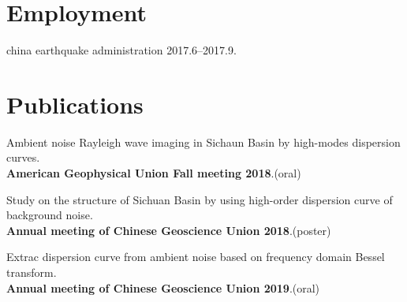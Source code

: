 \documentclass[letterpaper]{article}
\renewenvironment{itemize}{
  \begin{list}{}{
    \setlength{\leftmargin}{1.5em}
  }
}{
  \end{list}
}
\begin{document}
%
%
%


\section*{Employment}

\begin{itemize}
\item  china earthquake administration 2017.6--2017.9.

\end{itemize}


\section*{Publications}


\begin{itemize}
\item Ambient noise Rayleigh wave imaging in Sichaun Basin by high-modes dispersion curves.\\
\textbf{American Geophysical Union Fall meeting 2018}.(oral)
\item Study on the structure of Sichuan Basin by using high-order dispersion curve of background noise.\\
\textbf{Annual meeting of Chinese Geoscience Union 2018}.(poster)
\item Extrac dispersion curve from ambient noise based on frequency domain Bessel transform.\\
\textbf{Annual meeting of Chinese Geoscience Union 2019}.(oral)
\end{itemize}

%
\end{document}
